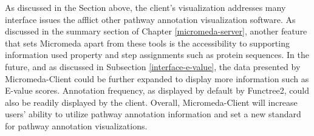 As discussed in the Section above, the client's visualization addresses many interface issues the afflict other pathway annotation visualization software. As discussed in the summary section of Chapter \ref{micromeda-server}, another feature that sets Micromeda apart from these tools is the accessibility to supporting information used property and step assignments such as protein sequences. In the future, and as discussed in Subsection \ref{interface-e-value}, the data presented by Micromeda-Client could be further expanded to display more information such as E-value scores. Annotation frequency, as displayed by default by Functree2, could also be readily displayed by the client. Overall, Micromeda-Client will increase users' ability to utilize pathway annotation information and set a new standard for pathway annotation visualizations.